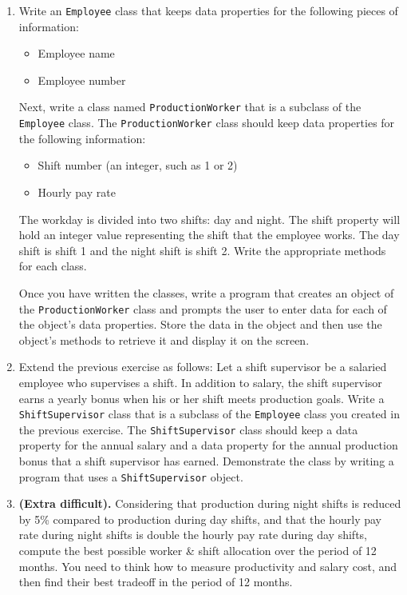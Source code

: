 \begin{enumerate}
\item Write an \texttt{Employee} class that keeps data properties for the following pieces of information: 
  \begin{itemize}
  \item Employee name
  \item Employee number
  \end{itemize}
  Next, write a class named \texttt{ProductionWorker} that is a subclass of the \texttt{Employee} class. The \texttt{ProductionWorker} class should keep data properties for the following information:
  \begin{itemize}
  \item Shift number (an integer, such as 1 or 2)
  \item Hourly pay rate
  \end{itemize}
  The workday is divided into two shifts: day and night. The shift property will hold an integer value representing the shift that the employee works. The day shift is shift 1 and the night shift is shift 2. Write the appropriate methods for each class.
  
  Once you have written the classes, write a program that creates an object of the \texttt{ProductionWorker} class and prompts the user to enter data for each of the object's data properties. Store the data in the object and then use the object's methods to retrieve it and display it on the screen.
  
\item Extend the previous exercise as follows: Let a shift supervisor be a salaried employee who supervises a shift. In addition to salary, the shift supervisor earns a yearly bonus when his or her shift meets production goals. Write a \texttt{ShiftSupervisor} class that is a subclass of the \texttt{Employee} class you created in the previous exercise. The \texttt{ShiftSupervisor} class should keep a data property for the annual salary and a data property for the annual production bonus that a shift supervisor has earned. Demonstrate the class by writing a program that uses a \texttt{ShiftSupervisor} object.
  
\item \textbf{(Extra difficult).} Considering that production during night shifts is reduced by 5\% compared to production during day shifts, and that the hourly pay rate during night shifts is double the hourly pay rate during day shifts, compute the best possible worker \& shift allocation over the period of 12 months. You need to think how to measure productivity and salary cost, and then find their best tradeoff in the period of 12 months.
\end{enumerate}
